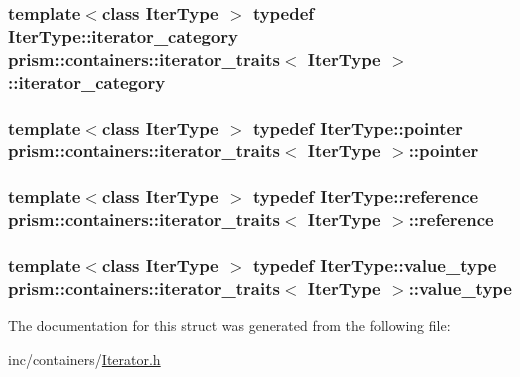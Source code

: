 \subsubsection[{\texorpdfstring{iterator\+\_\+category}{iterator_category}}]{\setlength{\rightskip}{0pt plus 5cm}template$<$class Iter\+Type $>$ typedef Iter\+Type\+::iterator\+\_\+category {\bf prism\+::containers\+::iterator\+\_\+traits}$<$ Iter\+Type $>$\+::{\bf iterator\+\_\+category}}\hypertarget{structprism_1_1containers_1_1iterator__traits_abfff3c9f89cb0bfaa226dddbd5c834ea}{}\label{structprism_1_1containers_1_1iterator__traits_abfff3c9f89cb0bfaa226dddbd5c834ea}
\subsubsection[{\texorpdfstring{pointer}{pointer}}]{\setlength{\rightskip}{0pt plus 5cm}template$<$class Iter\+Type $>$ typedef Iter\+Type\+::pointer {\bf prism\+::containers\+::iterator\+\_\+traits}$<$ Iter\+Type $>$\+::{\bf pointer}}\hypertarget{structprism_1_1containers_1_1iterator__traits_a1e0e2fe3c13aa8ce3059b58b4aa2bbc0}{}\label{structprism_1_1containers_1_1iterator__traits_a1e0e2fe3c13aa8ce3059b58b4aa2bbc0}
\subsubsection[{\texorpdfstring{reference}{reference}}]{\setlength{\rightskip}{0pt plus 5cm}template$<$class Iter\+Type $>$ typedef Iter\+Type\+::reference {\bf prism\+::containers\+::iterator\+\_\+traits}$<$ Iter\+Type $>$\+::{\bf reference}}\hypertarget{structprism_1_1containers_1_1iterator__traits_ad9d4fc80745a324d716f2fb95b8f5f80}{}\label{structprism_1_1containers_1_1iterator__traits_ad9d4fc80745a324d716f2fb95b8f5f80}
\subsubsection[{\texorpdfstring{value\+\_\+type}{value_type}}]{\setlength{\rightskip}{0pt plus 5cm}template$<$class Iter\+Type $>$ typedef Iter\+Type\+::value\+\_\+type {\bf prism\+::containers\+::iterator\+\_\+traits}$<$ Iter\+Type $>$\+::{\bf value\+\_\+type}}\hypertarget{structprism_1_1containers_1_1iterator__traits_a05456cbad2153f8d17c1095e38ddb476}{}\label{structprism_1_1containers_1_1iterator__traits_a05456cbad2153f8d17c1095e38ddb476}


The documentation for this struct was generated from the following file\+:\begin{DoxyCompactItemize}
\item 
inc/containers/\hyperlink{_iterator_8h}{Iterator.\+h}\end{DoxyCompactItemize}
